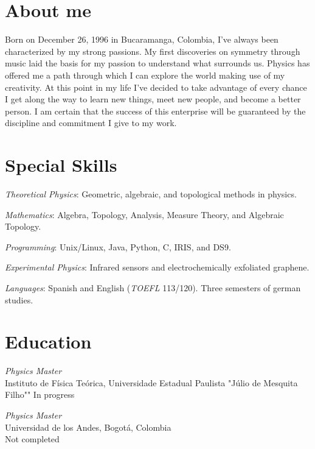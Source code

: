 \documentclass[line,margin]{res}
\begin{document}
\address{\href{mailto:ivanmbur@gmail.com}{ivanmbur@gmail.com}\\ Cr. 19 \# 63 27, Bogotá, Colombia\\ (+57) 316 782 1110}

\begin{resume}

\section{About me}

Born on December 26, 1996 in Bucaramanga, Colombia, I've always been characterized by my strong passions. My first discoveries on symmetry through music laid the basis for my passion to understand what surrounds us. Physics has offered me a path through which I can explore the world making use of my creativity. At this point in my life I've decided to take advantage of every chance I get along the way to learn new things, meet new people, and become a better person. I am certain that the success of this enterprise will be guaranteed by the discipline and commitment I give to my work. 

\section{Special Skills}

{\sl Theoretical Physics}: Geometric, algebraic, and topological methods in physics.

{\sl Mathematics}: Algebra, Topology, Analysis, Measure Theory, and Algebraic Topology.

{\sl Programming}: Unix/Linux, Java, Python, C, IRIS, and DS9.

{\sl Experimental Physics}: Infrared sensors and electrochemically exfoliated graphene. 

{\sl Languages}: Spanish and English ({\sl TOEFL} 113/120). Three semesters of german studies.

\section{Education}

{\sl Physics Master\\}
Instituto de Física Teórica, Universidade Estadual Paulista "Júlio de Mesquita Filho""
In progress

{\sl Physics Master\\}
Universidad de los Andes, Bogotá, Colombia\\
Not completed


\end{resume}
\end{document}
